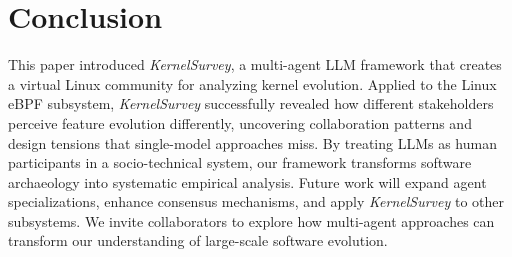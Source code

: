 \documentclass[sigconf,review,anonymous]{acmart}
\newcommand{\sys}{\textit{KernelSurvey}\xspace}
\begin{document}






\section{Conclusion}

This paper introduced \sys, a multi-agent LLM framework that creates a virtual Linux community for analyzing kernel evolution. Applied to the Linux eBPF subsystem, \sys successfully revealed how different stakeholders perceive feature evolution differently, uncovering collaboration patterns and design tensions that single-model approaches miss. By treating LLMs as human participants in a socio-technical system, our framework transforms software archaeology into systematic empirical analysis. Future work will expand agent specializations, enhance consensus mechanisms, and apply \sys to other subsystems. We invite collaborators to explore how multi-agent approaches can transform our understanding of large-scale software evolution.
\end{document}
